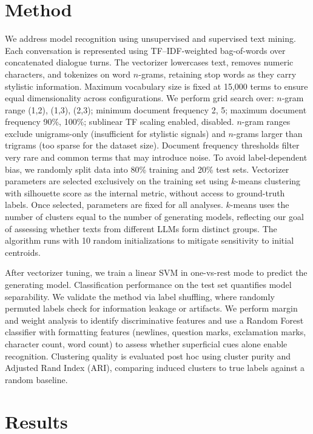 \documentclass[11pt]{article}
\begin{document}
\section{Method}

We address model recognition using unsupervised and supervised text mining. Each conversation is represented using TF--IDF-weighted bag-of-words over concatenated dialogue turns.
The vectorizer lowercases text, removes numeric characters, and tokenizes on word $n$-grams, retaining stop words as they carry stylistic information. Maximum vocabulary size is fixed at 15,000 terms to ensure equal dimensionality across configurations. We perform grid search over: $n$-gram range (1,2), (1,3), (2,3); minimum document frequency 2, 5; maximum document frequency 90\%, 100\%; sublinear TF scaling enabled, disabled.
$n$-gram ranges exclude unigrams-only (insufficient for stylistic signals) and $n$-grams larger than trigrams (too sparse for the dataset size). Document frequency thresholds filter very rare and common terms that may introduce noise.
To avoid label-dependent bias, we randomly split data into 80\% training and 20\% test sets. Vectorizer parameters are selected exclusively on the training set using $k$-means clustering with silhouette score as the internal metric, without access to ground-truth labels. Once selected, parameters are fixed for all analyses.
$k$-means uses the number of clusters equal to the number of generating models, reflecting our goal of assessing whether texts from different LLMs form distinct groups. The algorithm runs with 10 random initializations to mitigate sensitivity to initial centroids.

After vectorizer tuning, we train a linear SVM in one-vs-rest mode to predict the generating model. Classification performance on the test set quantifies model separability. We validate the method via label shuffling, where randomly permuted labels check for information leakage or artifacts.
We perform margin and weight analysis to identify discriminative features and use a Random Forest classifier with formatting features (newlines, question marks, exclamation marks, character count, word count) to assess whether superficial cues alone enable recognition.
Clustering quality is evaluated post hoc using cluster purity and Adjusted Rand Index (ARI), comparing induced clusters to true labels against a random baseline.

\section{Results}
\end{document}
